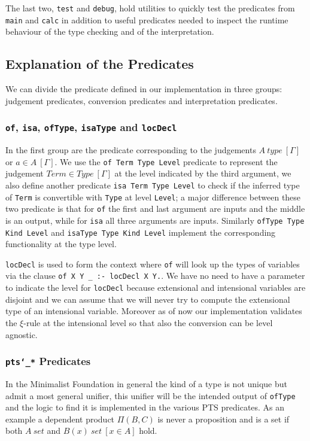 		The last two, \verb|test| and \verb|debug|,  hold utilities to quickly test the predicates from \verb|main| and \verb|calc| in addition to useful predicates needed to inspect the runtime behaviour of the type checking and of the interpretation.
	\subsection{Explanation of the Predicates}
	We can divide the predicate defined in our implementation in three groups: judgement predicates, conversion predicates and interpretation predicates.
	\subsubsection{\texttt{of}, \texttt{isa}, \texttt{ofType}, \texttt{isaType} and \texttt{locDecl}}
	In the first group are the predicate corresponding to the judgements $A \ type\ [\Gamma]$ or $a \in A\ [\Gamma]$. We use the \verb|of Term Type Level| predicate to represent the judgement $Term \in Type\ [\Gamma]$ at the level indicated by the third argument, we also define another predicate \verb|isa Term Type Level| to check if the inferred type of \verb|Term| is convertible with \verb|Type| at level \verb|Level|; a major difference between these two predicate is that for \verb|of| the first and last argument are inputs and the middle is an output, while for \verb|isa| all three arguments are inputs. Similarly \verb|ofType Type Kind Level| and \verb|isaType Type Kind Level| implement the corresponding functionality at the type level.
	
	\verb|locDecl| is used to form the context where \verb|of| will look up the types of variables via the clause \verb|of X Y _ :- locDecl X Y.|. We have no need to have a parameter to indicate the level for \verb|locDecl| because extensional and intensional variables are disjoint and we can assume that we will never try to compute the extensional type of an intensional variable. Moreover as of now our implementation validates the $\xi$-rule at the intensional level so that also the conversion can be level agnostic.
	
	\subsubsection{\texttt{pts\char`_*} Predicates}
	In the Minimalist Foundation in general the kind of a type is not unique but admit a most general unifier, this unifier will be the intended output of \verb|ofType| and the logic to find it is implemented in the various PTS predicates. As an example a dependent product $\Pi(B,C)$ is never a proposition  and is a set if both $A\ set$ and $B(x)\ set\ [x\in A]$ hold.
	
